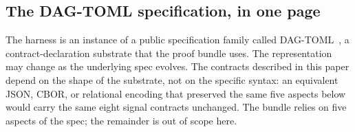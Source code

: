 \documentclass[11pt,letterpaper]{article}
\begin{document}
\subsection{The DAG-TOML specification, in one page}
\label{sec:spec}

The harness is an instance of a public specification family called
DAG-TOML~\cite{verivus2026dagtoml}, a contract-declaration substrate
that the proof bundle uses. The representation may change as the
underlying spec evolves. The contracts described in
this paper depend on the shape of the substrate, not on the
specific syntax: an equivalent JSON, CBOR, or relational encoding
that preserved the same five aspects below would carry the same
eight signal contracts unchanged. The bundle relies on five aspects
of the spec; the remainder is out of scope here.
\end{document}
